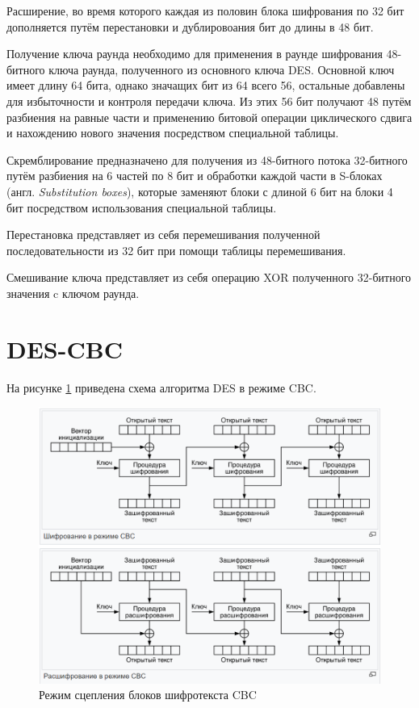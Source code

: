Расширение, во время которого каждая из половин блока шифрования по 32 бит дополняется путём перестановки и дублировоания бит до длины в 48 бит.

Получение ключа раунда необходимо для применения в раунде шифрования 48-битного ключа раунда, полученного из основного ключа DES. Основной ключ имеет длину 64 бита, однако значащих бит из 64 всего 56, остальные добавлены для избыточности и контроля передачи ключа. Из этих 56 бит получают 48 путём разбиения на равные части и применению битовой операции циклического сдвига и нахождению нового значения посредством специальной таблицы.

Скремблирование предназначено для получения из 48-битного потока 32-битного путём разбиения на 6 частей по 8 бит и обработки каждой части в S-блоках (англ. \textit{Substitution boxes}), которые заменяют блоки с длиной 6 бит на блоки 4 бит посредством использования специальной таблицы.

Перестановка представляет из себя перемешивания полученной последовательности из 32 бит при помощи таблицы перемешивания.

Смешивание ключа представляет из себя операцию XOR полученного 32-битного значения c ключом раунда.

\section{DES-CBC}

На рисунке \ref{fig:cbc} приведена схема алгоритма DES в режиме CBC.

\begin{figure}[ht!]
	\centering
	\includegraphics[width=0.7\linewidth]{img/cbc.png}
	\caption{Режим сцепления блоков шифротекста CBC}
	\label{fig:cbc}
\end{figure}
